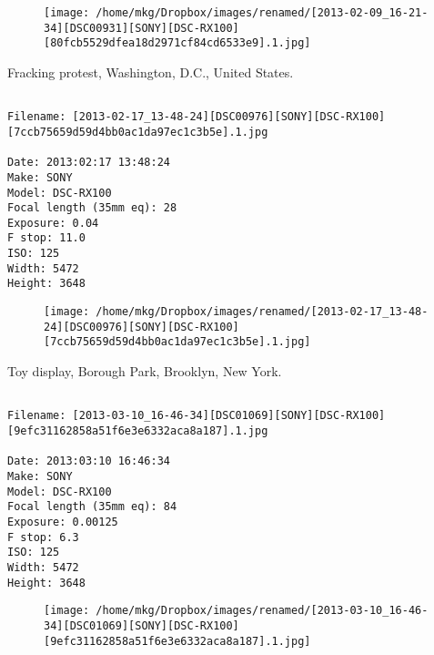 \begin{figure}
\texttt{[image: /home/mkg/Dropbox/images/renamed/[2013-02-09\_16-21-34][DSC00931][SONY][DSC-RX100][80fcb5529dfea18d2971cf84cd6533e9].1.jpg]}
\end{figure}
    
\clearpage
\onecolumn
\noindent Fracking protest, Washington, D.C., United States.
\noindent
\begin{lstlisting}

Filename: [2013-02-17_13-48-24][DSC00976][SONY][DSC-RX100][7ccb75659d59d4bb0ac1da97ec1c3b5e].1.jpg

Date: 2013:02:17 13:48:24
Make: SONY
Model: DSC-RX100
Focal length (35mm eq): 28
Exposure: 0.04
F stop: 11.0
ISO: 125
Width: 5472
Height: 3648
\end{lstlisting}
\clearpage

\begin{figure}
\texttt{[image: /home/mkg/Dropbox/images/renamed/[2013-02-17\_13-48-24][DSC00976][SONY][DSC-RX100][7ccb75659d59d4bb0ac1da97ec1c3b5e].1.jpg]}
\end{figure}
    
\clearpage
\onecolumn
\noindent Toy display, Borough Park, Brooklyn, New York.
\noindent
\begin{lstlisting}

Filename: [2013-03-10_16-46-34][DSC01069][SONY][DSC-RX100][9efc31162858a51f6e3e6332aca8a187].1.jpg

Date: 2013:03:10 16:46:34
Make: SONY
Model: DSC-RX100
Focal length (35mm eq): 84
Exposure: 0.00125
F stop: 6.3
ISO: 125
Width: 5472
Height: 3648
\end{lstlisting}
\clearpage

\begin{figure}
\texttt{[image: /home/mkg/Dropbox/images/renamed/[2013-03-10\_16-46-34][DSC01069][SONY][DSC-RX100][9efc31162858a51f6e3e6332aca8a187].1.jpg]}
\end{figure}
    
